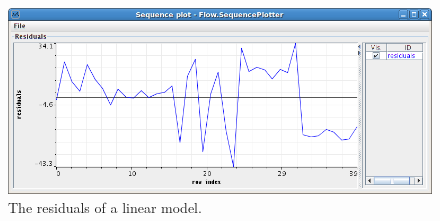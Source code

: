 \documentclass[a4paper]{book}
\begin{document}
\begin{figure}[ht]
	\centering
	\includegraphics[width=\textwidth]{images/dataframe-columns-output.png}
	\caption{The residuals of a linear model.}
	\label{dataframe-columns-output}
\end{figure}

\clearpage
\end{document}
